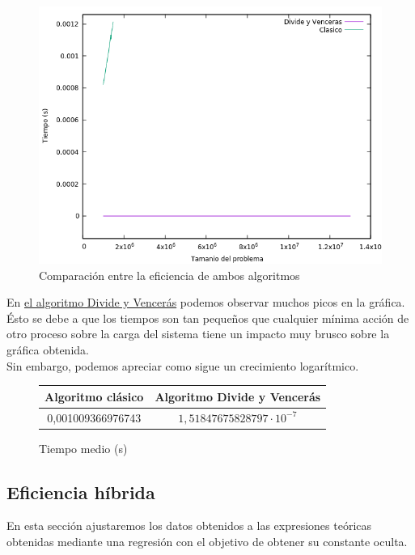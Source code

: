 \documentclass[12pt,spanish]{article}
\begin{document}
\begin{figure}[H]
\centering
\includegraphics[scale=0.75]{empirica_ambos.png}
\caption{Comparación entre la eficiencia de ambos algoritmos}
\end{figure}

En \textcolor{blue!60}{\hyperref[fig:dyv]{el algoritmo Divide y Vencerás}} podemos observar muchos picos en la gráfica. Ésto se debe a que los tiempos son tan pequeños que cualquier mínima acción de otro proceso sobre la carga del sistema tiene un impacto muy brusco sobre la gráfica obtenida.
\\
Sin embargo, podemos apreciar como sigue un crecimiento logarítmico.

\begin{figure}[H]
\centering
\begin{tabular}{|c|c|}
\hline
\textbf{Algoritmo clásico} & \textbf{Algoritmo Divide y Vencerás} \\
\hline
0,001009366976743 & $1,51847675828797 \cdot 10^{-7}$ \\
\hline
\end{tabular}
\caption{Tiempo medio (s)}
\end{figure}

\subsection{Eficiencia híbrida}

En esta sección ajustaremos los datos obtenidos a las expresiones teóricas obtenidas mediante una regresión con el objetivo de obtener su constante oculta.
\end{document}
